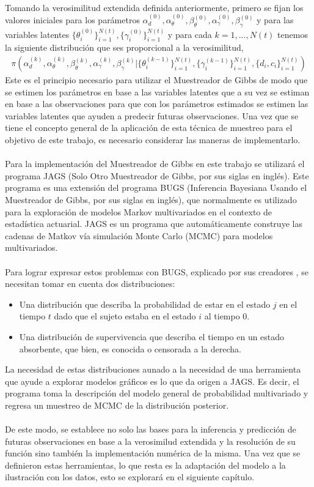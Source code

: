 \\
Tomando la verosimilitud extendida definida anteriormente, primero se fijan los valores iniciales para los par\'ametros $\alpha_d^{(0)},\alpha_\theta^{(0)},\beta_\theta^{(0)},\alpha_\gamma^{(0)},\beta_\gamma^{(0)}$ y para las variables latentes $\{\theta_i^{(0)}\}_{i=1}^{N(t)},\{\gamma_i^{(0)}\}_{i=1}^{N(t)}$ y para cada $k=1,...,N(t)$ tenemos la siguiente distribuci\'on que ses proporcional a la verosimilitud,
\begin{align*}
\pi(\alpha_d^{(k)},\alpha_\theta^{(k)},\beta_\theta^{(k)},\alpha_\gamma^{(k)},\beta_\gamma^{(k)}|\{\theta_i^{(k-1)}\}_{i=1}^{N(t)},\{\gamma_i^{(k-1)}\}_{i=1}^{N(t)},\{d_i,c_i\}_{i=1}^{N(t)})
\end{align*}
Este es el principio necesario para utilizar el Muestreador de Gibbs de modo que se estimen los par\'ametros en base a las variables latentes que a su vez se estiman en base a las observaciones para que con los par\'ametros estimados se estimen las variables latentes que ayuden a predecir futuras observaciones. Una vez que se tiene el concepto general de la aplicaci\'on de esta t\'ecnica de muestreo para el objetivo de este trabajo, es necesario considerar las maneras de implementarlo.\\
\\
Para la implementaci\'on del Muestreador de Gibbs en este trabajo se utilizar\'a el programa JAGS (Solo Otro Muestreador de Gibbs, por sus siglas en ingl\'es). Este programa es una extensi\'on del programa BUGS (Inferencia Bayesiana Usando el Muestreador de Gibbs, por sus siglas en ingl\'es), que normalmente es utilizado para la exploraci\'on de modelos Markov multivariados en el contexto de estad\'istica actuarial. JAGS es un programa que autom\'aticamente construye las cadenas de Matkov v\'ia simulaci\'on Monte Carlo (MCMC) para modelos multivariados.\\
\\
Para lograr expresar estos problemas con BUGS, explicado por sus creadores \cite{plummer2003jags}, se necesitan tomar en cuenta dos distribuciones:
\begin{itemize}
\item Una distribuci\'on que describa la probabilidad de estar en el estado $j$ en el tiempo $t$ dado que el sujeto estaba en el estado $i$ al tiempo $0$.
\item Una distribuci\'on de supervivencia que describa el tiempo en un estado absorbente, que bien, es conocida o censorada a la derecha.
\end{itemize}
La necesidad de estas distribuciones aunado a la necesidad de una herramienta que ayude a explorar modelos gr\'aficos es lo que da origen a JAGS. Es decir, el programa toma la descripci\'on del modelo general de probabilidad multivariado y regresa un muestreo de MCMC de la distribuci\'on posterior.\\
\\
De este modo, se establece no solo las bases para la inferencia y predicci\'on de futuras observaciones en base a la verosimilud extendida y la resoluci\'on de su funci\'on sino tambi\'en la implementaci\'on num\'erica de la misma. Una vez que se definieron estas herramientas, lo que resta es la adaptaci\'on del modelo a la ilustraci\'on con los datos, esto se explorar\'a en el siguiente cap\'itulo.  